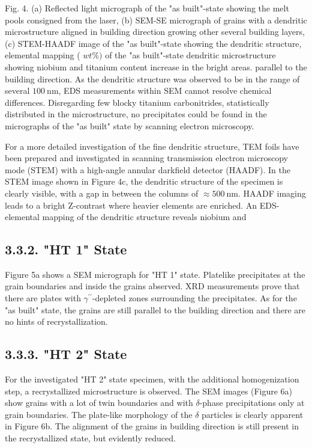 \documentclass[10pt]{article}
\begin{document}
Fig. 4. (a) Reflected light micrograph of the "as built"-state showing the melt pools consigned from the laser, (b) SEM-SE micrograph of grains with a dendritic microstructure aligned in building direction growing other several building layers, (c) STEM-HAADF image of the "as built"-state showing the dendritic structure, elemental mapping ( $w t \%)$ of the "as built"-state dendritic microstructure showing niobium and titanium content increase in the bright areas. parallel to the building direction. As the dendritic structure was observed to be in the range of several $100 \mathrm{~nm}$, EDS measurements within SEM cannot resolve chemical differences. Disregarding few blocky titanium carbonitrides, statistically distributed in the microstructure, no precipitates could be found in the micrographs of the "as built" state by scanning electron microscopy.

For a more detailed investigation of the fine dendritic structure, TEM foils have been prepared and investigated in scanning transmission electron microscopy mode (STEM) with a high-angle annular darkfield detector (HAADF). In the STEM image shown in Figure 4c, the dendritic structure of the specimen is clearly visible, with a gap in between the columns of $\approx 500 \mathrm{~nm}$. HAADF imaging leads to a bright Z-contrast where heavier elements are enriched. An EDS-elemental mapping of the dendritic structure reveals niobium and

\subsection*{3.3.2. "HT 1" State}
Figure 5a shows a SEM micrograph for "HT 1" state. Platelike precipitates at the grain boundaries and inside the grains abserved. XRD measurements prove that there are plates with $\gamma^{\prime \prime}$-depleted zones surrounding the precipitates. As for the "as built" state, the grains are still parallel to the building direction and there are no hints of recrystallization.

\subsection*{3.3.3. "HT 2" State}
For the investigated "HT 2" state specimen, with the additional homogenization step, a recrystallized microstructure is observed. The SEM images (Figure 6a) show grains with a lot of twin boundaries and with $\delta$-phase precipitations only at grain boundaries. The plate-like morphology of the $\delta$ particles is clearly apparent in Figure 6b. The alignment of the grains in building direction is still present in the recrystallized state, but evidently reduced.
\end{document}
